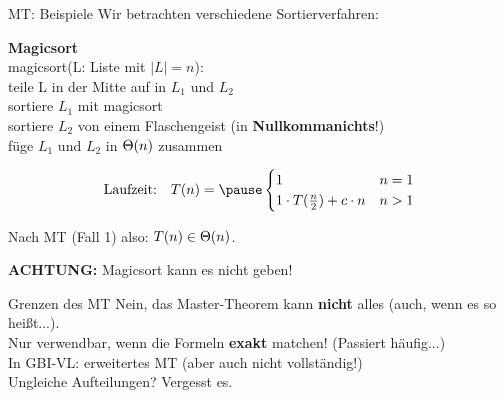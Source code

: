 \begin{frame}[t]{MT: Beispiele}
	Wir betrachten verschiedene Sortierverfahren:\\
	\bigskip
	
	\textbf{Magicsort}\\
	magicsort(L: Liste mit $|L| = n$):\\
	\quad teile L in der Mitte auf in $L_1$ und $L_2$\\
	\quad sortiere $L_1$ mit magicsort\\
	\quad sortiere $L_2$ von einem Flaschengeist (in \textbf{Nullkommanichts}!)\\
	\quad füge $L_1$ und $L_2$ in $\Theta\!\left(n\right)$ zusammen\\
	\medskip
	
	$$\text{Laufzeit:} \quad T(n) = \pause \begin{cases}
	1 & n = 1\\
	1 \cdot T(\fract n/2 ) + c \cdot n & n > 1
	\end{cases}$$
	
	\pause
	Nach MT (Fall 1) also: $T(n) \in \Theta\!\left(n\right)$.
	\medskip
	
	\textbf{ACHTUNG:} Magicsort kann es nicht geben!
\end{frame}


\begin{frame}{Grenzen des MT}
	Nein, das Master-Theorem kann \textbf{nicht} alles (auch, wenn es so heißt...). \\
	\smallskip
	\impl Nur verwendbar, wenn die Formeln \textbf{exakt} matchen! (Passiert häufig...) \\
	\smallskip
	In GBI-VL: erweitertes MT (aber auch nicht vollständig!) \\
	\medskip
	Ungleiche Aufteilungen? Vergesst es. \\
	
	
	
\end{frame}